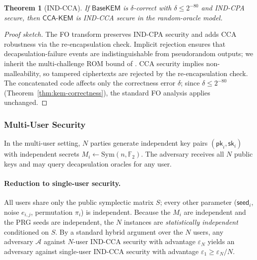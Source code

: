 \documentclass[11pt,a4paper]{article}
\theoremstyle{plain}
\newtheorem{theorem}{Theorem}[section]
\theoremstyle{definition}
\newcommand{\F}{\mathbb{F}}
\begin{document}
\begin{theorem}[IND-CCA]
If $\mathsf{BaseKEM}$ is $\delta$-correct with $\delta\leq 2^{-80}$ and IND-CPA secure, then $\mathsf{CCA\text{-}KEM}$ is IND-CCA secure in the random-oracle model.
\end{theorem}

\begin{proof}[Proof sketch]
The FO transform preserves IND-CPA security and adds CCA robustness via the re-encapsulation check. Implicit rejection ensures that decapsulation-failure events are indistinguishable from pseudorandom outputs; we inherit the multi-challenge ROM bound of \cite{HHK17}. CCA security implies non-malleability, so tampered ciphertexts are rejected by the re-encapsulation check. The concatenated code affects only the correctness error $\delta$; since $\delta\leq 2^{-80}$ (Theorem~\ref{thm:kem-correctness}), the standard FO analysis \cite{HHK17} applies unchanged.
\end{proof}

\subsubsection{Multi-User Security}
\label{subsubsec:kem-multiuser}

In the multi-user setting, $N$ parties generate independent key pairs $(\mathsf{pk}_i,\mathsf{sk}_i)$ with independent secrets $M_i\gets\mathrm{Sym}(n,\F_2)$. The adversary receives all $N$ public keys and may query decapsulation oracles for any user.

\paragraph{Reduction to single-user security.}
All users share only the public symplectic matrix $S$; every other parameter ($\mathsf{seed}_i$, noise $e_{i,j}$, permutation $\pi_i$) is independent. Because the $M_i$ are independent and the PRG seeds are independent, the $N$ instances are \emph{statistically independent} conditioned on $S$. By a standard hybrid argument over the $N$ users, any adversary $\mathcal{A}$ against $N$-user IND-CCA security with advantage $\varepsilon_{N}$ yields an adversary against single-user IND-CCA security with advantage $\varepsilon_{1}\geq\varepsilon_{N}/N$.
\end{document}
